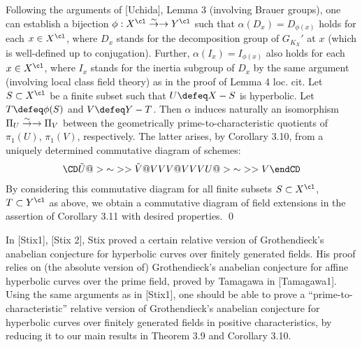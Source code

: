 Following the arguments of [Uchida], Lemma 3 
(involving Brauer groups), 
one can establish a bijection
$\phi:X^{\cl}\isom Y^{\cl}$ such that $\alpha (D_x)=D_{\phi(x)}$ 
holds for each $x\in X^{\cl}$, 
where $D_x$ stands for 
the decomposition group of $G_{K_{X}}'$ at $x$ (which is well-defined
up to conjugation). 
Further, $\alpha (I_x)=I_{\phi (x)}$ also holds for each 
$x\in X^{\cl}$, where $I_x$ stands for the inertia 
subgroup of $D_x$ by 
the same argument (involving local class field theory) 
as in the proof of Lemma 4 loc. cit. 
Let $S\subset X^{\cl}$ be a finite subset such that $U\defeq X-S$ is hyperbolic.
Let $T\defeq \phi (S)$ and $V\defeq Y-T$. Then $\alpha$ induces naturally an isomorphism
$\Pi_U\overset \sim \to \rightarrow \Pi_V$ between the geometrically prime-to-characteristic quotients of $\pi_1(U)$,
$\pi_1(V)$, respectively. The latter arises, by Corollary 3.10, from a uniquely determined
commutative diagram of schemes:
$$
\CD
\Tilde U @>{\sim}>> \Tilde V \\
@VVV   @VVV \\
U @>{\sim}>> V \\
\endCD
$$
By considering this commutative diagram for all finite subsets 
$S\subset X^{\cl}$, $T\subset Y^{\cl}$ as above, we obtain 
a commutative diagram of field extensions in the assertion of 
Corollary 3.11 with desired properties. 
\qed
\enddemo




 In [Stix1], [Stix 2], Stix proved a certain 
relative version 
of Grothendieck's anabelian conjecture 
for hyperbolic curves over finitely generated fields.
His proof relies on (the absolute version of) Grothendieck's anabelian conjecture for 
affine hyperbolic curves over the prime field, proved by Tamagawa in [Tamagawa1].
Using the same arguments as in [Stix1], one should be able to prove a ``prime-to-characteristic''
relative version of Grothendieck's anabelian conjecture for hyperbolic curves over 
finitely generated fields in positive characteristics, by reducing it to our main 
results in Theorem 3.9 and Corollary 3.10. 
\enddefinition

